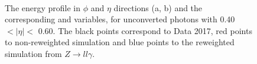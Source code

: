 \begin{figure}[htbp]
    \centering
	 \\
	\begin{tcolorbox}[colback=black!5!white,colframe=white!75!black]
    \caption{The energy profile in $\phi$ and $\eta$ directions (a, b) and the corresponding \Rphi and \Reta variables, for unconverted photons with 0.40 $ < |\eta| < $ 0.60. The black points correspond to Data 2017, red points to non-reweighted simulation and blue points to the reweighted simulation from $Z\rightarrow ll\gamma$.}
    \label{fig:gamma:ss:reweighting:photon:photon}
    \end{tcolorbox}
    

\end{figure}
